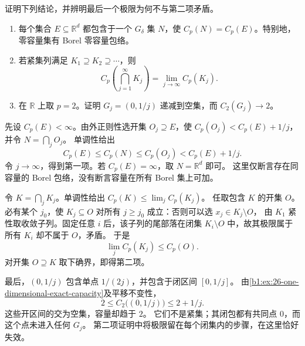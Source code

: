 \begin{exercise}\label{b1:ex:26-capacity-hulls-and-decreasing-sets}
证明下列结论，并辨明最后一个极限为何不与第二项矛盾。
\begin{enumerate}
 \item\label{b1:item:26-capacity-gdelta-hull}
 每个集合 \(E\subseteq\mathbb R^d\) 都包含于一个 \(G_\delta\) 集 \(N\)，使
 \(C_p(N)=C_p(E)\)。特别地，零容量集有 Borel 零容量包络。
 \item\label{b1:item:26-capacity-decreasing-compact}
 若紧集列满足 \(K_1\supseteq K_2\supseteq\cdots\)，则
 \[
  C_p\left(\bigcap_{j=1}^\infty K_j\right)=\lim_{j\to\infty}C_p(K_j).
 \]
 \item\label{b1:item:26-capacity-decreasing-open}
 在 \(\mathbb R\) 上取 \(p=2\)。证明 \(G_j=(0,1/j)\) 递减到空集，而
 \(C_2(G_j)\to2\)。
\end{enumerate}
\end{exercise}
\begin{solution}
先设 \(C_p(E)<\infty\)。由外正则性选开集 \(O_j\supseteq E\)，使
\(C_p(O_j)<C_p(E)+1/j\)，并令 \(N=\bigcap_jO_j\)。
单调性给出
\[
 C_p(E)\le C_p(N)\le C_p(O_j)<C_p(E)+1/j.
\]
令 \(j\to\infty\)，得到第一项。若 \(C_p(E)=\infty\)，取 \(N=\mathbb R^d\) 即可。
这里仅断言存在同容量的 Borel 包络，没有断言容量在所有 Borel 集上可加。

令 \(K=\bigcap_jK_j\)。单调性给出 \(C_p(K)\le\lim_jC_p(K_j)\)。
任取包含 \(K\) 的开集 \(O\)。必有某个 \(j_0\)，使 \(K_j\subseteq O\) 对所有
\(j\ge j_0\) 成立：否则可以选 \(x_j\in K_j\setminus O\)，
由 \(K_1\) 紧性取收敛子列。固定任意 \(i\) 后，该子列的尾部落在闭集
\(K_i\setminus O\) 中，故其极限属于所有 \(K_i\) 却不属于 \(O\)，矛盾。
于是
\[
 \lim_jC_p(K_j)\le C_p(O).
\]
对开集 \(O\supseteq K\) 取下确界，即得第二项。

最后，\((0,1/j)\) 包含单点 \(1/(2j)\)，并包含于闭区间 \([0,1/j]\)。
由\cref{b1:ex:26-one-dimensional-exact-capacity}及平移不变性，
\[
 2\le C_2\bigl((0,1/j)\bigr)\le2+1/j.
\]
这些开区间的交为空集，容量却趋于 \(2\)。
它们不是紧集；其闭包都有共同点 \(0\)，而这个点未进入任何 \(G_j\)。
第二项证明中将极限留在每个闭集内的步骤，在这里恰好失效。
\end{solution}

